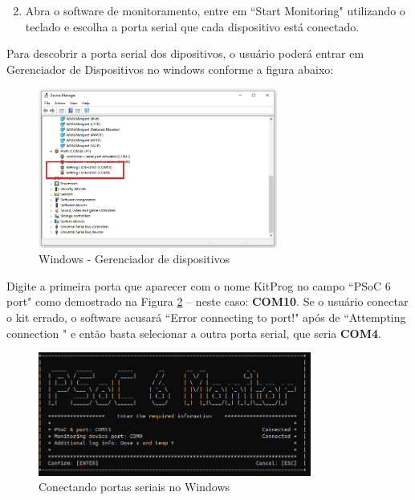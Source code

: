 \documentclass[12pt, a4paper]{article}
\begin{document}
\begin{enumerate}[leftmargin=1.3cm]
    \setcounter{enumi}{1}
    \item  Abra o software de monitoramento, entre em ``Start Monitoring" utilizando o teclado e escolha a porta serial que cada dispositivo está conectado.
\end{enumerate}

Para descobrir a porta serial dos dipositivos, o usuário poderá entrar em Gerenciador de Dispositivos no windows conforme a figura abaixo:

\begin{figure}[H]
    \centering
    \caption{Windows - Gerenciador de dispositivos}
    \includegraphics[width=0.7\textwidth]{../imgs/device_manager.png}

    \vspace{0.5em}
    \label{fig:device_manager}
\end{figure}

Digite a primeira porta que aparecer com o nome KitProg no campo ``PSoC 6 port" como demostrado na Figura \ref{fig:serial_windows} -- neste caso: \textbf{COM10}. Se o usuário conectar o kit errado, o software acusará ``Error connecting to port!" após de ``Attempting connection " e então basta selecionar a outra porta serial, que seria \textbf{COM4}.

\begin{figure}[H]
    \centering
    \caption{Conectando portas seriais no Windows}
    \includegraphics[width=0.8\textwidth]{../imgs/serial_windows.png}

    \vspace{0.5em}
    \label{fig:serial_windows}
\end{figure}
\end{document}
